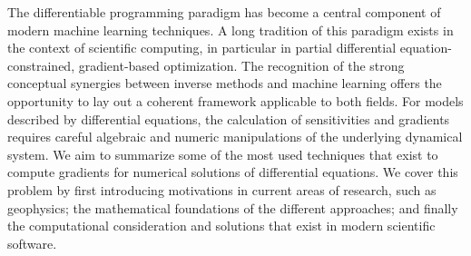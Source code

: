 The differentiable programming paradigm has become a central component of modern machine learning techniques. 
A long tradition of this paradigm exists in the context of scientific computing, in particular in partial differential equation-constrained, gradient-based optimization.
The recognition of the strong conceptual synergies between inverse methods and machine learning offers the opportunity to lay out a coherent framework applicable to both fields.
For models described by differential equations, the calculation of sensitivities and gradients requires careful algebraic and numeric manipulations of the underlying dynamical system.
We aim to summarize some of the most used techniques that exist to compute gradients for numerical solutions of differential equations. 
We cover this problem by first introducing motivations in current areas of research, such as geophysics; the mathematical foundations of the different approaches; and finally the computational consideration and solutions that exist in modern scientific software. 